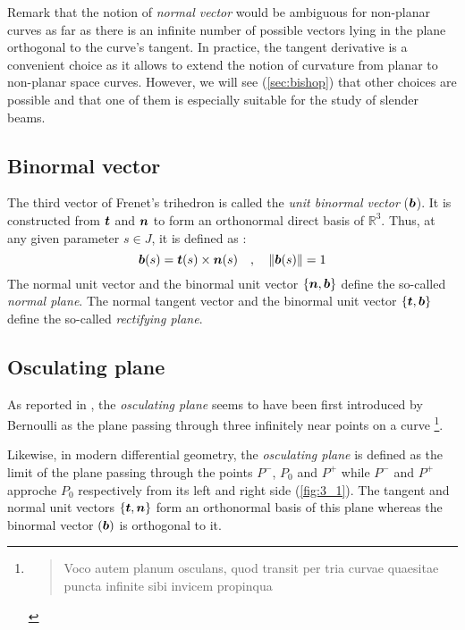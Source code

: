 Remark that the notion of \emph{normal vector} would be ambiguous for non-planar curves as far as there is an infinite number of possible vectors lying in the plane orthogonal to the curve's tangent. In practice, the tangent derivative is a convenient choice as it allows to extend the notion of curvature from planar to non-planar space curves. However, we will see (\cref{sec:bishop}) that other choices are possible and that one of them is especially suitable for the study of slender beams.

\subsection{Binormal vector}
The third vector of Frenet's trihedron is called the \emph{unit binormal vector} ($\boldsymbol{b}$). It is constructed from $\boldsymbol{t}$ and $\boldsymbol{n}$ to form an orthonormal direct basis of $\mathbb{R}^{3}$. Thus, at any given parameter $s \in J$, it is defined as :
\begin{equation}
	\boldsymbol{b}(s) = \boldsymbol{t}(s) \times \boldsymbol{n}(s)
	\quad,\quad
	\|\boldsymbol{b}(s)\|=1
\end{equation}
The normal unit vector and the binormal unit vector $\{\boldsymbol{n},\boldsymbol{b}\}$ define the so-called \emph{normal plane}. The normal tangent vector and the binormal unit vector $\{\boldsymbol{t},\boldsymbol{b}\}$ define the so-called \emph{rectifying plane}.

\subsection{Osculating plane}\label{sec:osculatingplane}
As reported in \cite[p.45]{Delcourt2007}, the \emph{osculating plane} seems to have been first introduced by Bernoulli as the plane passing through three infinitely near points on a curve
\footnote{
\blockcquote[p.113]{Bernoulli1728}{Voco autem planum osculans, quod transit per tria curvae quaesitae puncta infinite sibi invicem propinqua}.
}.

Likewise, in modern differential geometry, the \emph{osculating plane} is defined as the limit of the plane passing through the points $P^-$, $P_0$ and $P^+$ while $P^-$ and $P^+$ approche $P_0$ respectively from its left and right side (\cref{fig:3_1}). The tangent and normal unit vectors $\{\boldsymbol{t},\boldsymbol{n}\}$ form an orthonormal basis of this plane whereas the binormal vector $(\boldsymbol{b})$ is orthogonal to it.


